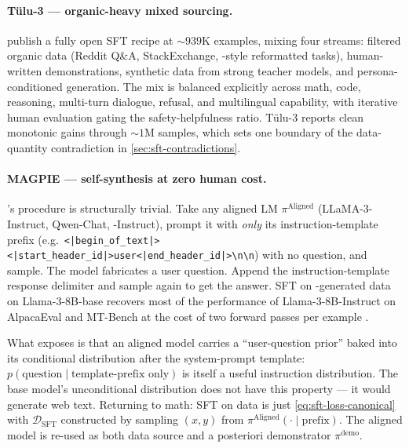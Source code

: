 \paragraph{T\"ulu-3 — organic-heavy mixed sourcing.} \citet{tulu3}
publish a fully open SFT recipe at $\sim\!939$K examples, mixing four
streams: filtered organic data (Reddit Q\&A, StackExchange, -style
reformatted tasks), human-written demonstrations, synthetic data from
strong teacher models, and persona-conditioned generation. The mix is
balanced explicitly across math, code, reasoning, multi-turn dialogue,
refusal, and multilingual capability, with iterative human evaluation
gating the safety-helpfulness ratio. T\"ulu-3 reports clean monotonic
gains through $\sim\!1$M samples, which sets one boundary of the
data-quantity contradiction in \cref{sec:sft-contradictions}.

\paragraph{MAGPIE — self-synthesis at zero human cost.}
\citet{magpie-2024}'s procedure is structurally trivial. Take any
aligned LM $\pi^{\mathrm{Aligned}}$ (LLaMA-3-Instruct, Qwen-Chat,
-Instruct), prompt it with \emph{only} its instruction-template
prefix (e.g.\ \texttt{<|begin\_of\_text|><|start\_header\_id|>user<|end\_header\_id|>\textbackslash n\textbackslash n})
with no question, and sample. The model fabricates a user question.
Append the instruction-template response delimiter and sample again to
get the answer. SFT on -generated data on Llama-3-8B-base
recovers most of the performance of Llama-3-8B-Instruct on AlpacaEval
and MT-Bench at the cost of two forward passes per example
\citep{magpie-2024}.

\begin{intuition}
What  exposes is that an aligned model carries a
``user-question prior'' baked into its conditional distribution after
the system-prompt template: $p(\text{question} \mid
\text{template-prefix only})$ is itself a useful instruction
distribution. The base model's unconditional distribution does not
have this property — it would generate web text. Returning to math:
SFT on  data is just \cref{eq:sft-loss-canonical} with
$\mathcal{D}_{\mathrm{SFT}}$ constructed by sampling $(x, y)$ from
$\pi^{\mathrm{Aligned}}(\cdot \mid \text{prefix})$. The aligned model is
re-used as both data source and a posteriori demonstrator
$\pi^{\mathrm{demo}}$.
\end{intuition}

